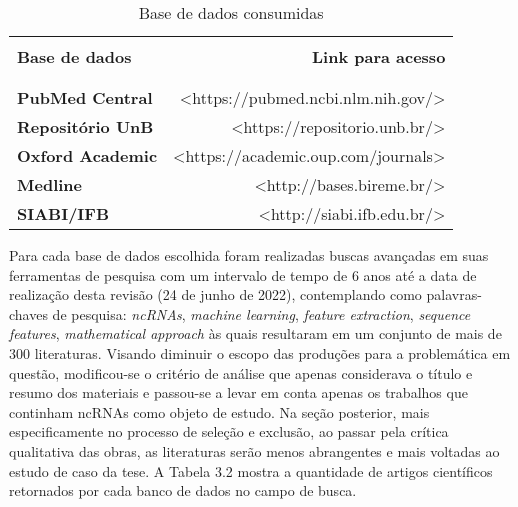 \begin{table}[h!]
  \begin{center}
    \caption{Base de dados consumidas}
    \label{tab:table1}
    \begin{tabular}{l r} %
      \hline \\
      \textbf{Base de dados} & \textbf{Link para acesso} \\ \\
      \hline \\
      \textbf{PubMed Central} & <https://pubmed.ncbi.nlm.nih.gov/> \\
      \textbf{Repositório UnB} & <https://repositorio.unb.br/> \\
      \textbf{Oxford Academic} & <https://academic.oup.com/journals>\\
      \textbf{Medline} & <http://bases.bireme.br/>\\
      \textbf{SIABI/IFB} & <http://siabi.ifb.edu.br/> 
      \\ \hline 
    \end{tabular}
  \end{center}
\end{table}

Para cada base de dados escolhida foram realizadas buscas avançadas em suas
ferramentas de pesquisa com um intervalo de tempo de 6 anos até a data de
realização desta revisão (24 de junho de 2022), contemplando como palavras-chaves de pesquisa: \textit{ncRNAs}, \textit{machine learning}, \textit{feature extraction}, \textit{sequence features}, \textit{mathematical approach} às quais resultaram em um conjunto de mais de 300 literaturas. Visando diminuir o escopo das produções para a problemática em questão, modificou-se o critério de análise que apenas considerava o título e resumo dos materiais e passou-se a levar em conta apenas os trabalhos que continham ncRNAs como objeto de estudo. Na seção posterior, mais especificamente no processo de seleção e exclusão, ao passar pela crítica qualitativa das obras, as literaturas serão menos abrangentes e mais voltadas ao estudo de caso da tese. A Tabela 3.2 mostra a quantidade de artigos científicos retornados por cada banco de dados no campo de busca.

